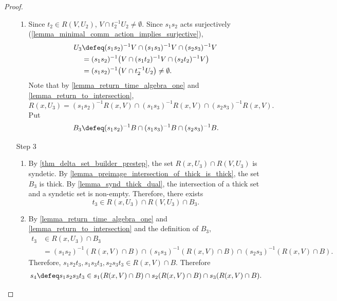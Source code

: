 \begin{proof}
\begin{enumerate}
\begin{enumerate}
            \item Since $t_2 \in R(V,U_2)$, $V \cap t_2^{-1} U_2 \neq \emptyset$.  Since $s_1s_2$ acts surjectively (\cref{lemma_minimal_comm_action_implies_surjective}),
            \begin{align*}
                U_3 &\defeq (s_1s_2)^{-1} V \cap (s_1 s_3)^{-1} V \cap (s_2 s_3)^{-1} V \\
                &= (s_1s_2)^{-1} \big( V \cap (s_1 t_2)^{-1} V \cap (s_2 t_2)^{-1} V \big)\\
                &= (s_1s_2)^{-1} \big( V \cap t_2^{-1} U_2\big) \neq \emptyset.
            \end{align*}
            Note that by \cref{lemma_return_time_algebra_one} and \cref{lemma_return_to_intersection},
            \[R(x,U_3) = (s_1s_2)^{-1} R(x,V) \cap (s_1s_3)^{-1} R(x,V) \cap (s_2s_3)^{-1}R(x,V).\]
            Put
            \[B_3 \defeq (s_1s_2)^{-1} B \cap (s_1s_3)^{-1} B \cap (s_2s_3)^{-1} B.\]
        \end{enumerate}

        \item[Step 3]
        \begin{enumerate}
            \item By \cref{thm_delta_set_builder_prestep}, the set $R(x,U_3) \cap R(V,U_3)$ is syndetic.  By \cref{lemma_preimage_intersection_of_thick_is_thick}, the set $B_3$ is thick. By \cref{lemma_synd_thick_dual}, the intersection of a thick set and a syndetic set is non-empty.  Therefore, there exists
            \[t_3 \in R(x,U_3) \cap R(V,U_3) \cap B_3.\]

            \item By \cref{lemma_return_time_algebra_one} and \cref{lemma_return_to_intersection} and the definition of $B_3$,
            \begin{align*}
                t_3 &\in R(x,U_3) \cap B_3 \\
                &= (s_1s_2)^{-1} (R(x,V) \cap B) \cap (s_1s_3)^{-1} (R(x,V) \cap B) \cap (s_2s_3)^{-1}(R(x,V) \cap B).
            \end{align*}
            Therefore, $s_1 s_2 t_3, s_1 s_3 t_3, s_2 s_3 t_3 \in R(x,V) \cap B$.  Therefore
            \begin{align}
                \label{eqn_delta_it_three}
                s_4 \defeq s_1s_2 s_3t_3  \in s_1 (R(x,V) \cap B) \cap s_2 (R(x,V) \cap B) \cap s_3 (R(x,V) \cap B).
            \end{align}


\end{enumerate}
\end{enumerate}
\end{proof}
